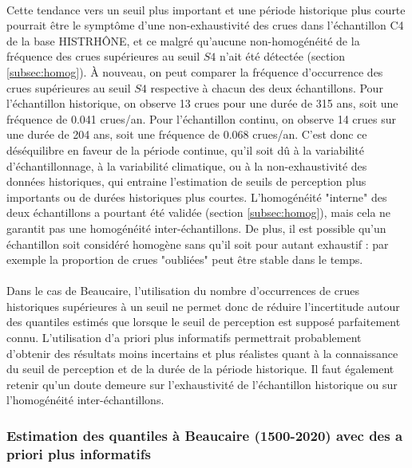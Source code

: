 \documentclass[11pt]{article}
\begin{document}
	\paragraph{} Cette tendance vers un seuil plus important et une période historique plus courte pourrait être le symptôme d'une non-exhaustivité des crues dans l'échantillon C4 de la base HISTRHÔNE, et ce malgré qu'aucune non-homogénéité de la fréquence des crues supérieures au seuil $S4$ n'ait été détectée (section \ref{subsec:homog}). À nouveau, on peut comparer la fréquence d'occurrence des crues supérieures au seuil $S4$ respective à chacun des deux échantillons. Pour l'échantillon historique, on observe 13 crues pour une durée de 315 ans, soit une fréquence de 0.041 crues/an. Pour l'échantillon continu, on observe 14 crues sur une durée de 204 ans, soit une fréquence de 0.068 crues/an. C'est donc ce déséquilibre en faveur de la période continue, qu'il soit dû à la variabilité d'échantillonnage, à la variabilité climatique, ou à la non-exhaustivité des données historiques, qui entraine l'estimation de seuils de perception plus importants ou de durées historiques plus courtes. L'homogénéité "interne" des deux échantillons a pourtant été validée (section \ref{subsec:homog}), mais cela ne garantit pas une homogénéité inter-échantillons. De plus, il est possible qu'un échantillon soit considéré homogène sans qu'il soit pour autant exhaustif : par exemple la proportion de crues "oubliées" peut être stable dans le temps.
	
	
	\paragraph{} Dans le cas de Beaucaire, l'utilisation du nombre d'occurrences de crues historiques supérieures à un seuil ne permet donc de réduire l'incertitude autour des quantiles estimés que lorsque le seuil de perception est supposé parfaitement connu. L'utilisation d'a priori plus informatifs permettrait probablement d'obtenir des résultats moins incertains et plus réalistes quant à la connaissance du seuil de perception et de la durée de la période historique. Il faut également retenir qu'un doute demeure sur l'exhaustivité de l'échantillon historique ou sur l'homogénéité inter-échantillons.
	 
	 \subsubsection{Estimation des quantiles à Beaucaire (1500-2020) avec des a priori plus informatifs}
	 \label{subsec:D*}
\end{document}
